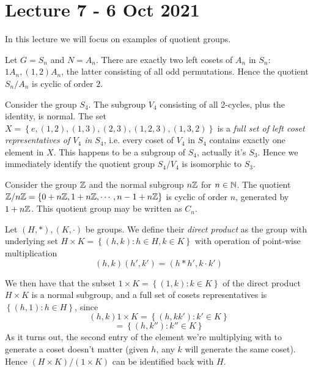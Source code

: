 \section{Lecture 7 - 6 Oct 2021}
In this lecture we will focus on examples of quotient groups.

\begin{example}
  Let $G=S_n$ and $N=A_n$. There are exactly two left cosets of $A_n$ in $S_n$: $1A_n,
  (1,2)A_n$, the latter consisting of all odd permutations. Hence the quotient $S_n/A_n$
  is cyclic of order $2$.
\end{example}

\begin{example}
  Consider the group $S_4$. The subgroup $V_4$ consisting of all 2-cycles, plus the
  identity, is normal. The set $X=\left\{ e,(1,2),(1,3),(2,3),(1,2,3),(1,3,2) \right\}$ is
  a \emph{full set of left coset representatives of $V_4$ in $S_4$}, i.e. every coset of
  $V_4$ in $S_4$ contains exactly one element in $X$. This happens to be a subgroup of
  $S_4$, actually it's $S_3$. Hence we immediately identify the quotient group $S_4/V_4$
  is isomorphic to $S_3$.
\end{example}

\begin{example}
  Consider the group $\mathbb Z$ and the normal subgroup $n\mathbb Z$ for $n\in\mathbb N$. The quotient
  $\mathbb Z/n\mathbb Z=\left\{ 0+n\mathbb Z, 1+n\mathbb Z, \cdots, n-1+n\mathbb Z \right\}$ is cyclic of order $n$,
  generated by $1+n\mathbb Z$. This quotient group may be written as $C_n$.
\end{example}

\begin{definition}
  Let $(H,*),(K,\cdot)$ be groups. We define their \emph{direct product} as the group
  with underlying set $H\times K = \left\{ (h,k) : h\in H, k\in K \right\}$ with operation
  of point-wise multiplication
  \[(h,k)(h',k')=(h*h',k\cdot k')\]
  \label{directProduct}
\end{definition}

We then have that the subset $1\times K=\left\{ (1,k) :k\in K \right\}$ of the direct
product $H\times K$ is a normal subgroup, and a full set of cosets representatives is
$\left\{ (h,1) : h\in H \right\}$, since
\[(h,k) 1\times K = \left\{ (h,kk') :k'\in K \right\}\]
\[= \left\{ (h, k'') : k''\in K \right\}\]
As it turns out, the second entry of the element we're multiplying with to generate a
coset doesn't matter (given $h$, any $k$ will generate the same coset). Hence $(H\times
K)/(1\times K)$ can be identified back with $H$.

